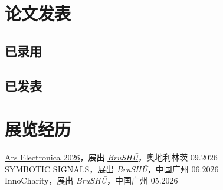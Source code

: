\section*{论文发表}

\nocite{*}

\subsection*{已录用}
\printbibliography[filter=accepted,heading=none,resetnumbers=true]

\subsection*{已发表}
\printbibliography[filter=published,heading=none,resetnumbers=true]


\section*{展览经历}
\href{https://ars.electronica.art/negotiatinghumanity/en/view/brushu-38238ddb450c814c8b2eef5e8757151e/}{Ars Electronica 2026}，展出 \href{https://ars.electronica.art/negotiatinghumanity/en/notion/brushu/}{\textit{BruSHŪ}}，奥地利林茨 \hfill 09.2026\\
SYMBOTIC SIGNALS，展出 \textit{BruSHŪ}，中国广州 \hfill 06.2026\\
InnoCharity，展出 \textit{BruSHŪ}，中国广州 \hfill 05.2026\\
